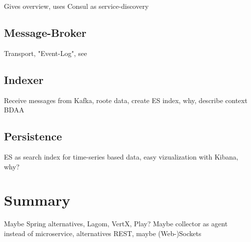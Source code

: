 Gives overview, uses Consul as service-discovery

\subsection{Message-Broker}

Transport, "Event-Log", see \cite{Kreps13}

\subsection{Indexer}

Receive messages from Kafka, roote data, create ES index, why, describe context BDAA

\subsection{Persistence}

ES as search index for time-series based data, easy vizualization with Kibana, why?

\section{Summary}

Maybe Spring alternatives, Lagom, VertX, Play?
Maybe collector as agent instead of microservice, alternatives REST, maybe (Web-)Sockets

